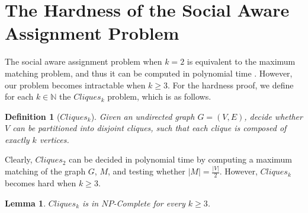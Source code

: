 \documentclass[letterpaper]{article} %
\newtheorem{lemma}{Lemma}
\newtheorem{definition}{Definition}
\begin{document}
\section{The Hardness of the Social Aware Assignment Problem}
The social aware assignment problem when $k=2$ is equivalent to the maximum matching problem, and thus it can be computed in polynomial time \cite{edmons1965paths}.
However, our problem becomes intractable when $k \geq 3$.
For the hardness proof, we define for each $k \in \mathbb{N}$ the $Cliques_k$ problem, which is as follows.
\begin{definition}[$Cliques_k$]
Given an undirected graph $G=(V,E)$, decide whether $V$ can be partitioned into disjoint cliques, such that each clique is composed of exactly $k$ vertices.
\end{definition}
Clearly, $Cliques_2$ can be decided in polynomial time by computing a maximum matching of the graph $G$, $M$, and testing whether $|M| = \frac{|V|}{2}$.
However, $Cliques_k$ becomes hard when $k\geq 3$.
\begin{lemma}
$Cliques_k$ is in $NP$-Complete for every $k\geq3$.
\end{lemma}
\end{document}
